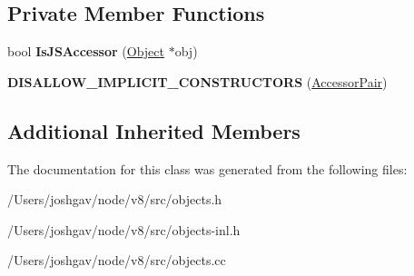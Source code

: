 \subsection*{Private Member Functions}
\begin{DoxyCompactItemize}
\item 
bool {\bfseries Is\+J\+S\+Accessor} (\hyperlink{classv8_1_1internal_1_1_object}{Object} $\ast$obj)\hypertarget{classv8_1_1internal_1_1_accessor_pair_a9aaa05972bbd7ccc9cdfb67618063a99}{}\label{classv8_1_1internal_1_1_accessor_pair_a9aaa05972bbd7ccc9cdfb67618063a99}

\item 
{\bfseries D\+I\+S\+A\+L\+L\+O\+W\+\_\+\+I\+M\+P\+L\+I\+C\+I\+T\+\_\+\+C\+O\+N\+S\+T\+R\+U\+C\+T\+O\+RS} (\hyperlink{classv8_1_1internal_1_1_accessor_pair}{Accessor\+Pair})\hypertarget{classv8_1_1internal_1_1_accessor_pair_ae52e8536100b025147dec6b149b42b50}{}\label{classv8_1_1internal_1_1_accessor_pair_ae52e8536100b025147dec6b149b42b50}

\end{DoxyCompactItemize}
\subsection*{Additional Inherited Members}


The documentation for this class was generated from the following files\+:\begin{DoxyCompactItemize}
\item 
/\+Users/joshgav/node/v8/src/objects.\+h\item 
/\+Users/joshgav/node/v8/src/objects-\/inl.\+h\item 
/\+Users/joshgav/node/v8/src/objects.\+cc\end{DoxyCompactItemize}
